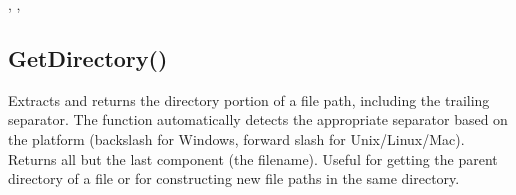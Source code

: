 \documentclass[letterpaper,10pt,english]{sphinxmanual}
\begin{document}
\sphinxAtStartPar
{}

\sphinxAtStartPar
{}, , 

\ignorespaces 

\subsection{GetDirectory()}
\label{\detokenize{reference/utility:getdirectory}}\label{\detokenize{reference/utility:index-50}}
\sphinxAtStartPar
{}

\sphinxAtStartPar
{}

\sphinxAtStartPar
Extracts and returns the directory portion of a file path, including the trailing separator. The function automatically detects the appropriate separator based on the platform (backslash for Windows, forward slash for Unix/Linux/Mac). Returns all but the last component (the filename). Useful for getting the parent directory of a file or for constructing new file paths in the same directory.

\sphinxAtStartPar
{}

\begin{sphinxVerbatim}[commandchars=\\\{\}]
\end{sphinxVerbatim}

\sphinxAtStartPar
{}
\end{document}
